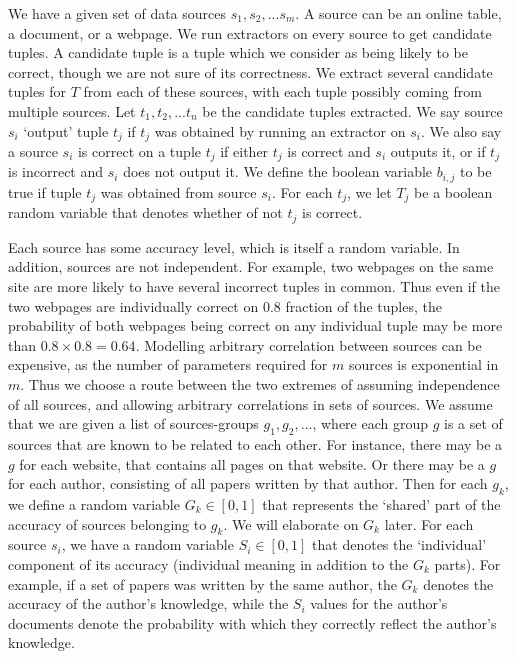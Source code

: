 \documentclass{sig-alternate}
\newcounter{prob}
\begin{document}
We have a given set of data sources $s_1, s_2, ... s_m$. A source can be an online table, a document, or a webpage. We run extractors on every source to get candidate tuples. A candidate tuple is a tuple which we consider as being likely to be correct, though we are not sure of its correctness. We extract several candidate tuples for $T$ from each of these sources, with each tuple possibly coming from multiple sources. Let $t_1, t_2, ... t_n$ be the candidate tuples extracted. We say source $s_i$ `output' tuple $t_j$ if $t_j$ was obtained by running an extractor on $s_i$. We also say a source $s_i$ is correct on a tuple $t_j$ if either $t_j$ is correct and $s_i$ outputs it, or if $t_j$ is incorrect and $s_i$ does not output it. We define the boolean variable $b_{i,j}$ to be true if tuple $t_j$ was obtained from source $s_i$. For each $t_j$, we let $T_j$ be a boolean random variable that denotes whether of not $t_j$ is correct. 

Each source has some accuracy level, which is itself a random variable. In addition, sources are not independent. For example, two webpages on the same site are more likely to have several incorrect tuples in common. Thus even if the two webpages are individually correct on $0.8$ fraction of the tuples, the probability of both webpages being correct on any individual tuple may be more than $0.8 \times 0.8 = 0.64$. Modelling arbitrary  correlation between sources can be expensive, as the number of parameters required for $m$ sources is exponential in $m$. Thus we choose a route between the two extremes of assuming independence of all sources, and allowing arbitrary correlations in sets of sources. We assume that we are given a list of sources-groups $g_1, g_2, ...$, where each group $g$ is a set of sources that are known to be related to each other. For instance, there may be a $g$ for each website, that contains all pages on that website. Or there may be a $g$ for each author, consisting of all papers written by that author. Then for each $g_k$, we define a random variable $G_k \in [0,1]$ that represents the `shared' part of the accuracy of sources belonging to $g_k$. We will elaborate on $G_k$ later. For each source $s_i$, we have a random variable $S_i \in [0,1]$ that denotes the `individual' component of its accuracy (individual meaning in addition to the $G_k$ parts). For example, if a set of papers was written by the same author, the $G_k$ denotes the accuracy of the author's knowledge, while the $S_i$ values for the author's documents denote the probability with which they correctly reflect the author's knowledge.
\end{document}
